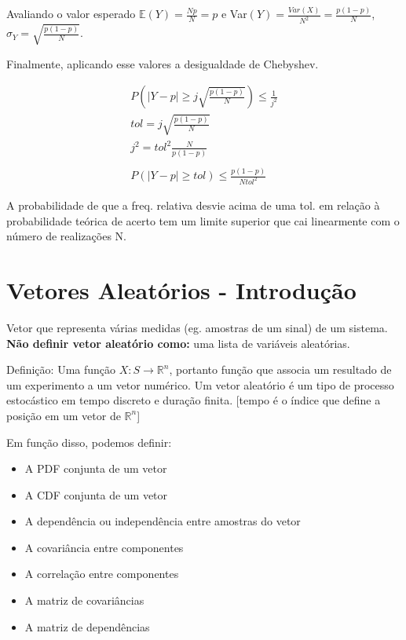 \documentclass{article}
\renewcommand\bf[1]{\textbf{#1}}
\newcommand{\bb}[1]{\mathbb{#1}}
\begin{document}
Avaliando o valor esperado $\bb{E}(Y) = \frac{Np}{N} = p$ e Var$(Y) = \frac{Var(X)}{N^2} = \frac{p(1-p)}{N}$, $\sigma_Y = \sqrt{\frac{p(1-p)}{N}}$.

Finalmente, aplicando esse valores a desigualdade de Chebyshev.

\begin{align*}
    P(|Y - p| \geq j \sqrt{\frac{p(1-p)}{N}}) \leq \frac{1}{j^2} \\
    tol = j \sqrt{\frac{p(1-p)}{N}} \\
    j^2 = tol^2 \frac{N}{p(1-p)} \\
    \\
    P(|Y - p| \geq tol) \leq \frac{p(1-p)}{N tol^2}
\end{align*}

A probabilidade de que a freq. relativa desvie acima de uma tol. em relação à probabilidade teórica
de acerto tem um limite superior que cai linearmente com o número de realizações N.

\section{Vetores Aleatórios - Introdução}
Vetor que representa várias medidas (eg. amostras de um sinal) de um sistema. \bf{Não definir
vetor aleatório como:} uma lista de variáveis aleatórias.

Definição: Uma função $X: S \rightarrow \mathbb{R}^n$, portanto função que associa um resultado de
um experimento a um vetor numérico. Um vetor aleatório é um tipo de processo estocástico em tempo
discreto e duração finita. [tempo é o índice que define a posição em um vetor de $\mathbb{R}^n$]

Em função disso, podemos definir:
\begin{itemize}
    \item A PDF conjunta de um vetor
    \item A CDF conjunta de um vetor
    \item A dependência ou independência entre amostras do vetor
    \item A covariância entre componentes
    \item A correlação entre componentes
    \item A matriz de covariâncias
    \item A matriz de dependências
\end{itemize}
\end{document}
